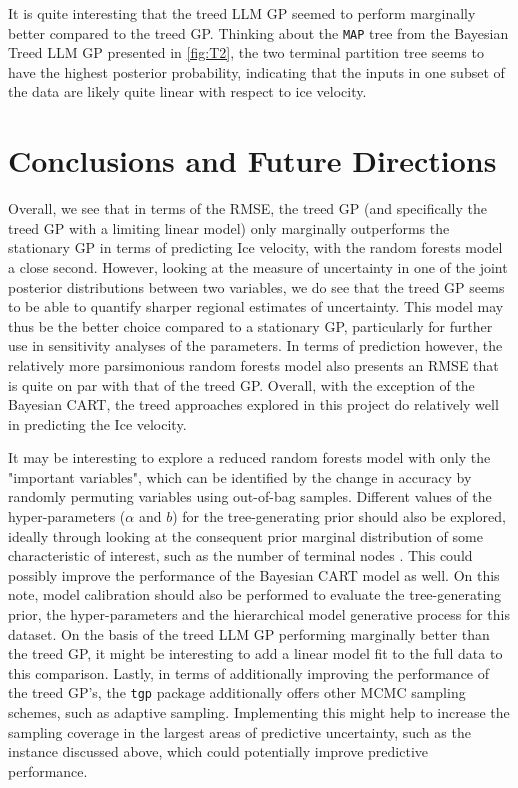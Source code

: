 \documentclass{article}\usepackage[]{graphicx}\usepackage[]{color}
\begin{document}
It is quite interesting that the treed LLM GP seemed to perform marginally better compared to the treed GP. Thinking about the \texttt{MAP} tree from the Bayesian Treed LLM GP presented in \ref{fig:T2}, the two terminal partition tree seems to have the highest posterior probability, indicating that the inputs in one subset of the data are likely quite linear with respect to ice velocity. 

\section*{Conclusions and Future Directions}

Overall, we see that in terms of the RMSE, the treed GP (and specifically the treed GP with a limiting linear model) only marginally outperforms the stationary GP in terms of predicting Ice velocity, with the random forests model a close second. However, looking at the measure of uncertainty in one of the joint posterior distributions between two variables, we do see that the treed GP seems to be able to quantify sharper regional estimates of uncertainty. This model may thus be the better choice compared to a stationary GP, particularly for further use in sensitivity analyses of the parameters. In terms of prediction however, the relatively more parsimonious random forests model also presents an RMSE that is quite on par with that of the treed GP. Overall, with the exception of the Bayesian CART, the treed approaches explored in this project do relatively well in predicting the Ice velocity. 
\smallskip \par
It may be interesting to explore a reduced random forests model with only the "important variables", which can be identified by the change in accuracy by randomly permuting variables using out-of-bag samples. Different values of the hyper-parameters ($\alpha$ and $b$) for the tree-generating prior should also be explored, ideally through looking at the consequent prior marginal distribution of some characteristic of interest, such as the number of terminal nodes \cite{chipman_george_mcculloch_1998}. This could possibly improve the performance of the Bayesian CART model as well. On this note, model calibration should also be performed to evaluate the tree-generating prior, the hyper-parameters and the hierarchical model generative process for this dataset. On the basis of the treed LLM GP performing marginally better than the treed GP, it might be interesting to add a linear model fit to the full data to this comparison.  Lastly, in terms of additionally improving the performance of the treed GP's, the \texttt{tgp} package additionally offers other MCMC sampling schemes, such as adaptive sampling. Implementing this might help to increase the sampling coverage in the largest areas of predictive uncertainty, such as the instance discussed above, which could potentially improve predictive performance. 
\end{document}

